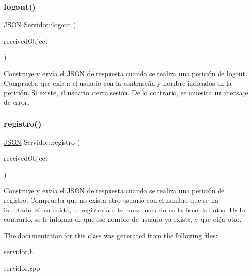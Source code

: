\subsubsection{\texorpdfstring{logout()}{logout()}}
{\footnotesize\ttfamily \mbox{\hyperlink{classnlohmann_1_1basic__json}{J\+S\+ON}} Servidor\+::logout (\begin{DoxyParamCaption}\item[{\mbox{\hyperlink{classnlohmann_1_1basic__json}{J\+S\+ON}}}]{received\+Object }\end{DoxyParamCaption})}

Construye y envía el J\+S\+ON de respuesta cuando se realiza una petición de logout. Comprueba que exista el usuario con la contraseña y nombre indicados en la petición. Si existe, el usuario cierra sesión. De lo contrario, se muestra un mensaje de error. \mbox{\label{classServidor_adc19f6be9f624330db206a9d98c981a5}} 
\subsubsection{\texorpdfstring{registro()}{registro()}}
{\footnotesize\ttfamily \mbox{\hyperlink{classnlohmann_1_1basic__json}{J\+S\+ON}} Servidor\+::registro (\begin{DoxyParamCaption}\item[{\mbox{\hyperlink{classnlohmann_1_1basic__json}{J\+S\+ON}}}]{received\+Object }\end{DoxyParamCaption})}

Construye y envía el J\+S\+ON de respuesta cuando se realiza una petición de registro. Comprueba que no exista otro usuario con el nombre que se ha insertado. Si no existe, se registra a este nuevo usuario en la base de datos. De lo contrario, se le informa de que ese nombre de usuario ya existe, y que elija otro. 

The documentation for this class was generated from the following files\+:\begin{DoxyCompactItemize}
\item 
servidor.\+h\item 
servidor.\+cpp\end{DoxyCompactItemize}
